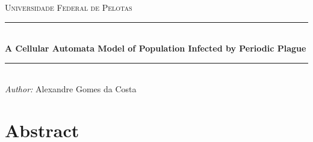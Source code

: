 \documentclass{article}
\begin{document}

\begin{titlepage}

\newcommand{\HRule}{\rule{\linewidth}{0.5mm}} %

\center %

\textsc{\LARGE Universidade Federal de Pelotas}\\[1.5cm]

\HRule \\[0.4cm]
{\huge \bfseries A Cellular Automata Model of Population Infected by Periodic Plague}\\[0.4cm]
\HRule \\[1.5cm]

\emph{Author:} Alexandre Gomes da Costa

\vfill %

\end{titlepage}


\tableofcontents %

\newpage %


\section{Abstract}
\end{document}
